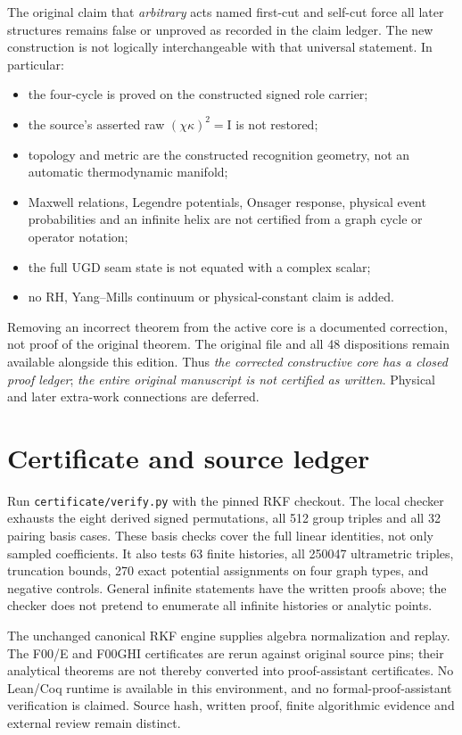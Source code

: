 \documentclass[11pt]{article}
\newcommand{\Id}{\mathrm I}
\newcommand{\cut}{\kappa}
\newcommand{\selfcut}{\chi}
\begin{document}
The original claim that \emph{arbitrary} acts named first-cut and self-cut
force all later structures remains false or unproved as recorded in the
claim ledger. The new construction is not logically interchangeable with
that universal statement. In particular:
\begin{itemize}
\item the four-cycle is proved on the constructed signed role carrier;
\item the source's asserted raw $(\selfcut\cut)^2=\Id$ is not restored;
\item topology and metric are the constructed recognition geometry, not an
  automatic thermodynamic manifold;
\item Maxwell relations, Legendre potentials, Onsager response, physical
  event probabilities and an infinite helix are not certified from a graph
  cycle or operator notation;
\item the full UGD seam state is not equated with a complex scalar;
\item no RH, Yang--Mills continuum or physical-constant claim is added.
\end{itemize}
Removing an incorrect theorem from the active core is a documented correction,
not proof of the original theorem. The original file and all 48 dispositions
remain available alongside this edition. Thus \emph{the corrected constructive
core has a closed proof ledger}; \emph{the entire original manuscript is not
certified as written}. Physical and later extra-work connections are deferred.

\section{Certificate and source ledger}
\label{sec:certificate}
Run \texttt{certificate/verify.py} with the pinned RKF checkout. The local
checker exhausts the eight derived signed permutations, all 512 group triples
and all 32 pairing basis cases. These basis checks cover the full linear
identities, not only sampled coefficients. It also tests 63 finite histories,
all 250047 ultrametric triples, truncation bounds, 270 exact potential
assignments on four graph types, and negative controls. General infinite
statements have the written proofs above; the checker does not pretend to
enumerate all infinite histories or analytic points.

The unchanged canonical RKF engine supplies algebra normalization and replay.
The F00/E and F00GHI certificates are rerun against original source pins;
their analytical theorems are not thereby converted into proof-assistant
certificates. No Lean/Coq runtime is available in this environment, and no
formal-proof-assistant verification is claimed. Source hash, written proof,
finite algorithmic evidence and external review remain distinct.
\end{document}
